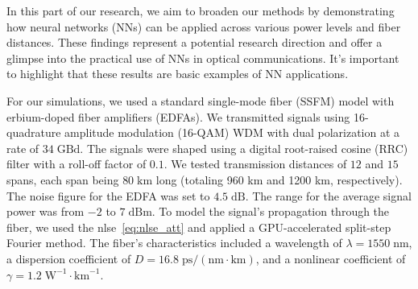 

In this part of our research, we aim to broaden our methods by demonstrating how neural networks (NNs) can be applied across various power levels and fiber distances. These findings represent a potential research direction and offer a glimpse into the practical use of NNs in optical communications. It's important to highlight that these results are basic examples of NN applications.

For our simulations, we used a standard single-mode fiber (SSFM) model with erbium-doped fiber amplifiers (EDFAs). We transmitted signals using 16-quadrature amplitude modulation (16-QAM) WDM with dual polarization at a rate of $34\;\textrm{GBd}$. The signals were shaped using a digital root-raised cosine (RRC) filter with a roll-off factor of $0.1$. We tested transmission distances of $12$ and $15$ spans, each span being $80\;\textrm{km}$ long (totaling 960 km and 1200 km, respectively). The noise figure for the EDFA was set to $4.5\;\textrm{dB}$. The range for the average signal power was from $-2$ to $7\;\textrm{dBm}$. To model the signal's propagation through the fiber, we used the \gls{nlse}~\eqref{eq:nlse_att} and applied a GPU-accelerated split-step Fourier method\cite{esf0_2023_7880552}. The fiber's characteristics included a wavelength of $\lambda = 1550\;\textrm{nm}$, a dispersion coefficient of $D = 16.8\;\textrm{ps}/(\textrm{nm} \cdot \textrm{km})$, and a nonlinear coefficient of $\gamma = 1.2\;\textrm{W}^{-1} \cdot \textrm{km}^{-1}$.


